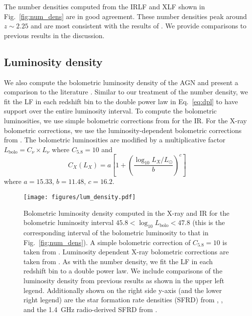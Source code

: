 \documentclass[twocolumn, trackchanges]{aastex63}
\begin{document}
The number densities computed from the IRLF and XLF shown in Fig.~\ref{fig:num_dens} are in good agreement.
These number densities peak around $z\sim 2.25$ and are most consistent with the results of \cite{ranalli_210_2016}.
We provide comparisons to previous results \citep{aird_evolution_2010, yencho_optx_2009, silverman_luminosity_2008, brandt_xmm-newton_2009} in the discussion.

\subsection{Luminosity density}
We also compute the bolometric luminosity density of the AGN and present a comparison to the literature \citep{aird_evolution_2010, brandt_xmm-newton_2009, lacy_optical_2007}.
Similar to our treatment of the number density, we fit the LF in each redshift bin to the double power law in Eq.~\ref{eq:dpl} to have support over the entire luminosity interval.
To compute the bolometric luminosities, we use simple bolometric corrections from \cite{lacy_spitzer_2015} for the IR.
For the X-ray bolometric corrections, we use the luminosity-dependent bolometric corrections from \cite{duras_universal_2020}.
The bolometric luminosities are modified by a multiplicative factor $L_\mathrm{bolo} = C_\nu\times L_\nu$ where $C_{5.8} = 10$ and
\begin{equation}
C_X(L_X) = a\left[1+\left(\frac{\log_{10}{L_X/L_\odot}}{b}\right)^c\right]
\end{equation}
where $a=15.33$, $b=11.48$, $c=16.2$.

\begin{figure*}[hptb]
\centering
\texttt{[image: figures/lum\_density.pdf]}
\caption{Bolometric luminosity density computed in the X-ray and IR for the bolometric luminosity interval $45.8 < \log_{10}L_\mathrm{bolo} < 47.8$ (this is the corresponding interval of the bolometric luminosity to that in Fig.~\ref{fig:num_dens}). A simple bolometric correction of $C_{5.8}=10$ is taken from \cite{lacy_spitzer_2015}. Luminosity dependent X-ray bolometric corrections are taken from \cite{duras_universal_2020}. As with the number density, we fit the LF in each redshift bin to a double power law. We include comparisons of the luminosity density from previous results \citep{ranalli_210_2016,lacy_optical_2007} as shown in the upper left legend.  Additionally shown on the right side y-axis (and the lower right legend) are the star formation rate densities (SFRD) from \cite{madau_cosmic_2014}, \cite{zavala_evolution_2021}, and the \SI{1.4}{GHz} radio-derived SFRD from \cite{matthews_cosmic_2021}.}
\label{fig:lum_dens}
\end{figure*}
\end{document}
